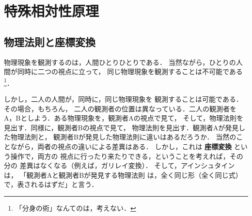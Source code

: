 ﻿%
    \section{特殊相対性原理}
        \subsection{物理法則と座標変換}
            物理現象を観測するのは，人間ひとりひとりである．
            当然ながら，ひとりの人間が同時に二つの視点に立って，
            同じ物理現象を観測することは不可能である
                \footnote{
                    「分身の術」なんてのは，考えない．
                }．

            しかし，二人の人間が，同時に，同じ物理現象を
            観測することは可能である．その場合，もちろん，
            二人の観測者の位置は異なっている．二人の観測者を
            A，Bとしよう．ある物理現象を，観測者Aの視点で見て，
            そして，物理法則を見出す．同様に，観測者Bの視点で見て，
            物理法則を見出す．観測者Aが発見した物理法則と，
            観測者Bが発見した物理法則に違いはあるだろうか．
            当然のことながら，両者の視点の違いによる差異はある．
            しかし，これは \textbf{座標変換} という操作で，両方の
            視点に行ったり来たりできる，ということを考えれば，その分の
            差異はなくなる（例えば，ガリレイ変換）．
            そして，アインシュタインは，
            「観測者Aと観測者Bが発見する物理法則
            は，全く同じ形（全く同じ式）で，表されるはずだ」と言う．

